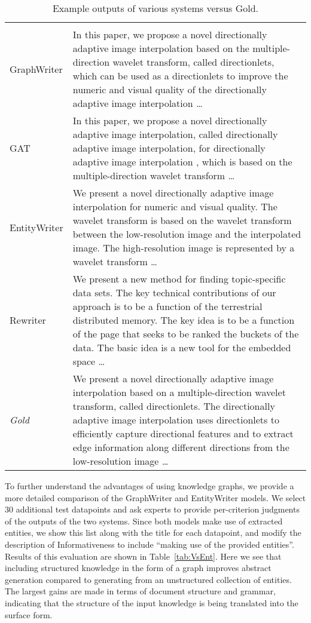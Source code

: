 \documentclass[11pt,a4paper]{article}
\begin{document}
\begin{table*}[t]
\begin{small}
\begin{tabularx}{\textwidth}{lX}
    \hline \\
GraphWriter & In this paper, we propose a novel directionally adaptive image interpolation based on the multiple-direction wavelet transform, called directionlets, which can be used as a directionlets to improve the numeric and visual quality of the directionally adaptive image interpolation \ldots \\
GAT & In this paper, we propose a novel directionally adaptive image interpolation, called directionally adaptive image interpolation, for directionally adaptive image interpolation , which is based on the multiple-direction wavelet transform \ldots \\
EntityWriter & We present a novel directionally adaptive image interpolation for numeric and visual quality. The wavelet transform is based on the wavelet transform between the low-resolution image and the interpolated image. The high-resolution image is represented by a wavelet transform \ldots \\
Rewriter & We present a new method for finding topic-specific data sets. The key technical contributions of our approach is to be a function of the terrestrial distributed memory. The key idea is to be a function of the page that seeks to be ranked the buckets of the data. The basic idea is a new tool for the embedded space \ldots \\
{\it Gold} & We present a novel directionally adaptive image interpolation based on a multiple-direction wavelet transform, called directionlets. The directionally adaptive image interpolation uses directionlets to efficiently capture directional features and to extract edge information along different directions from the low-resolution image \ldots
\end{tabularx}
\end{small}
\caption{Example outputs of various systems versus Gold.}
\label{tab:output}
\end{table*}
To further understand the advantages of using knowledge graphs, we provide a more detailed comparison of the GraphWriter and EntityWriter models.
We select 30 additional test datapoints and ask experts to provide per-criterion judgments of the outputs of the two systems. 
Since both models make use of extracted entities, we show this list along with the title for each datapoint, and modify the description of Informativeness to include ``making use of the provided entities''.
Results of this evaluation are shown in Table~\ref{tab:VsEnt}.
Here we see that including structured knowledge in the form of a graph improves abstract generation compared to generating from an unstructured collection of entities.  
The largest gains are made in terms of document structure and grammar, indicating that the structure of the input knowledge is being translated into the surface form. 
\end{document}
